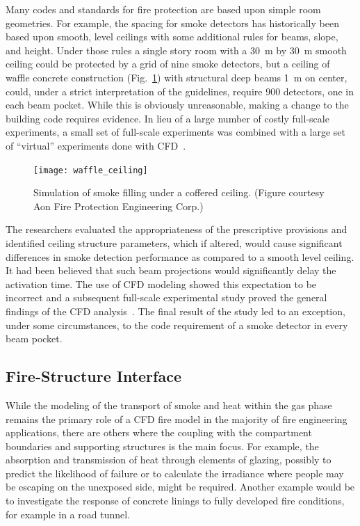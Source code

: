 \documentclass[graybox]{svmult}
\begin{document}
Many codes and standards for fire protection are based upon simple room geometries. For example, the spacing for smoke detectors has historically been based upon smooth, level ceilings with some additional rules for beams, slope, and height.  Under those rules a single story room with a 30~m by 30~m smooth ceiling could be protected by a grid of nine smoke detectors, but a ceiling of waffle concrete construction (Fig.~\ref{waffle_ceiling}) with structural deep beams 1~m on center, could, under a strict interpretation of the guidelines, require 900 detectors, one in each beam pocket. While this is obviously unreasonable, making a change to the building code requires evidence. In lieu of a large number of costly full-scale experiments, a small set of full-scale experiments was combined with a large set of ``virtual'' experiments done with CFD~\cite{O'Connor:NFPRF,Mealy:NFPRF}.
\begin{figure}[ht]
\texttt{[image: waffle\_ceiling]}
\caption{Simulation of smoke filling under a coffered ceiling. (Figure courtesy Aon Fire Protection Engineering Corp.)}
\label{waffle_ceiling}
\end{figure}
The researchers evaluated the appropriateness of the prescriptive provisions and identified ceiling structure parameters, which if altered, would cause significant differences in smoke detection performance as compared to a smooth level ceiling. It had been believed that such beam projections would significantly delay the activation time. The use of CFD modeling showed this expectation to be incorrect and a subsequent full-scale experimental study proved the general findings of the CFD analysis~\cite{Gottuk:2008}. The final result of the study led to an exception, under some circumstances, to the code requirement of a smoke detector in every beam pocket.




\subsection{Fire-Structure Interface}

While the modeling of the transport of smoke and heat within the gas phase remains the primary role of a CFD fire model in the majority of fire engineering applications, there are others where the coupling with the compartment boundaries and supporting structures is the main focus. For example, the absorption and transmission of heat through elements of glazing, possibly to predict the likelihood of failure or to calculate the irradiance where people may be escaping on the unexposed side, might be required. Another example would be to investigate the response of concrete linings to fully developed fire conditions, for example in a road tunnel.
\end{document}
